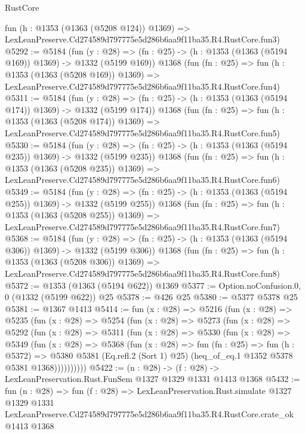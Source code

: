 \begin{lexlean}{RustCore}
\begin{coremodule}
    fun (h : @1353 (@1363 (@5208 @124)) @1369) =>
    LexLeanPreserve.Cd274589d797775e5d286b6aa9f11ba35.R4.RustCore.fun3)
@5292 := @5184
    (fun (y : @28) => (fn : @25) -> (h : @1353 (@1363 (@5194 @169)) @1369) -> @1332 (@5199 @169))
    @1368
    (fun (fn : @25) =>
    fun (h : @1353 (@1363 (@5208 @169)) @1369) =>
    LexLeanPreserve.Cd274589d797775e5d286b6aa9f11ba35.R4.RustCore.fun4)
@5311 := @5184
    (fun (y : @28) => (fn : @25) -> (h : @1353 (@1363 (@5194 @174)) @1369) -> @1332 (@5199 @174))
    @1368
    (fun (fn : @25) =>
    fun (h : @1353 (@1363 (@5208 @174)) @1369) =>
    LexLeanPreserve.Cd274589d797775e5d286b6aa9f11ba35.R4.RustCore.fun5)
@5330 := @5184
    (fun (y : @28) => (fn : @25) -> (h : @1353 (@1363 (@5194 @235)) @1369) -> @1332 (@5199 @235))
    @1368
    (fun (fn : @25) =>
    fun (h : @1353 (@1363 (@5208 @235)) @1369) =>
    LexLeanPreserve.Cd274589d797775e5d286b6aa9f11ba35.R4.RustCore.fun6)
@5349 := @5184
    (fun (y : @28) => (fn : @25) -> (h : @1353 (@1363 (@5194 @255)) @1369) -> @1332 (@5199 @255))
    @1368
    (fun (fn : @25) =>
    fun (h : @1353 (@1363 (@5208 @255)) @1369) =>
    LexLeanPreserve.Cd274589d797775e5d286b6aa9f11ba35.R4.RustCore.fun7)
@5368 := @5184
    (fun (y : @28) => (fn : @25) -> (h : @1353 (@1363 (@5194 @306)) @1369) -> @1332 (@5199 @306))
    @1368
    (fun (fn : @25) =>
    fun (h : @1353 (@1363 (@5208 @306)) @1369) =>
    LexLeanPreserve.Cd274589d797775e5d286b6aa9f11ba35.R4.RustCore.fun8)
@5372 := @1353 (@1363 (@5194 @622)) @1369
@5377 := Option.noConfusion.{0, 0} (@1332 (@5199 @622)) @25
@5378 := @426 @25
@5380 := @5377 @5378 @25
@5381 := @1367 @1413
@5414 := fun (x : @28) =>
  @5216
    (fun (x : @28) =>
    @5235
      (fun (x : @28) =>
      @5254
        (fun (x : @28) =>
        @5273
          (fun (x : @28) =>
          @5292
            (fun (x : @28) =>
            @5311
              (fun (x : @28) =>
              @5330
                (fun (x : @28) =>
                @5349
                  (fun (x : @28) =>
                  @5368
                    (fun (x : @28) =>
                    fun (fn : @25) =>
                    fun (h : @5372) =>
                    @5380
                      @5381
                      (Eq.refl.{2} (Sort 1) @25)
                      (heq_of_eq.{1} @1352 @5378 @5381 @1368))))))))))
@5422 := (n : @28) -> (f : @28) -> LexLeanPreservation.Rust.FunSem @1327 @1329 @1331 @1413 @1368
@5432 := fun (n : @28) =>
  fun (f : @28) =>
  LexLeanPreservation.Rust.simulate
    @1327
    @1329
    @1331
    LexLeanPreserve.Cd274589d797775e5d286b6aa9f11ba35.R4.RustCore.crate_ok
    @1413
    @1368
\end{coremodule}
\end{lexlean}
